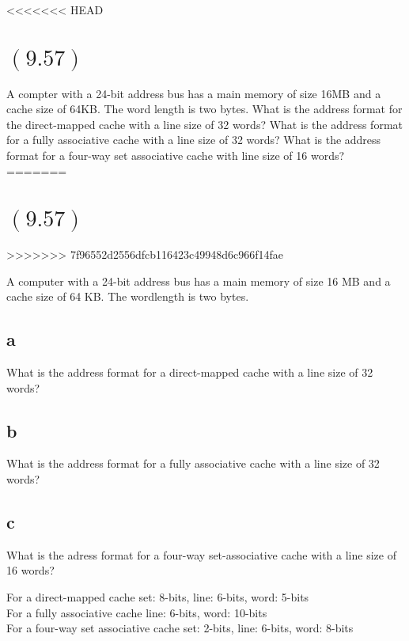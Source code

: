 \documentclass[letterpaper,12pt,titlepage]{article}
\begin{document}
<<<<<<< HEAD
\section*{$(9.57)$} A compter with a 24-bit address bus has a main memory of size 16MB and a cache size of 64KB. The word length is two bytes. What is the address format for the direct-mapped cache with a line size of 32 words? What is the address format for a fully associative cache with a line size of 32 words? What is the address format for a four-way set associative cache with line size of 16 words?
=======
\section*{$(9.57)$}
>>>>>>> 7f96552d2556dfcb116423c49948d6c966f14fae

A computer with a 24-bit address bus has a main memory of size 16 MB and a cache size of 64 KB. The wordlength is two bytes.

\subsection*{a} What is the address format for a direct-mapped cache with a line size of 32 words?
\begin{mdframed}[style=MyFrame]
\end{mdframed}
\subsection*{b} What is the address format for a fully associative cache with a line size of 32 words?
\begin{mdframed}[style=MyFrame]
\end{mdframed}
\subsection*{c} What is the adress format for a four-way set-associative cache with a line size of 16 words?
\begin{mdframed}[style=MyFrame]
For a direct-mapped cache set: 8-bits, line: 6-bits, word: 5-bits\\
For a fully associative cache  line: 6-bits, word: 10-bits \\
For a four-way set associative cache set: 2-bits, line: 6-bits, word: 8-bits
\end{mdframed}





\end{document}
